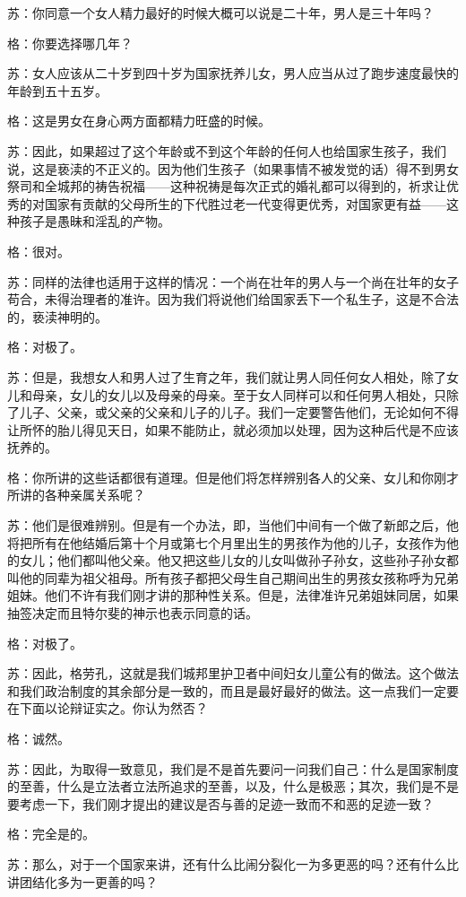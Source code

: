 \documentclass[12pt,oneside]{book}
\begin{document}
苏：你同意一个女人精力最好的时候大概可以说是二十年，男人是三十年吗？

格：你要选择哪几年？

苏：女人应该从二十岁到四十岁为国家抚养儿女，男人应当从过了跑步速度最快的年龄到五十五岁。

格：这是男女在身心两方面都精力旺盛的时候。

苏：因此，如果超过了这个年龄或不到这个年龄的任何人也给国家生孩子，我们说，这是亵渎的不正义的。因为他们生孩子（如果事情不被发觉的话）得不到男女祭司和全城邦的祷告祝福——这种祝祷是每次正式的婚礼都可以得到的，祈求让优秀的对国家有贡献的父母所生的下代胜过老一代变得更优秀，对国家更有益——这种孩子是愚昧和淫乱的产物。

格：很对。

苏：同样的法律也适用于这样的情况：一个尚在壮年的男人与一个尚在壮年的女子苟合，未得治理者的准许。因为我们将说他们给国家丢下一个私生子，这是不合法的，亵渎神明的。

格：对极了。

苏：但是，我想女人和男人过了生育之年，我们就让男人同任何女人相处，除了女儿和母亲，女儿的女儿以及母亲的母亲。至于女人同样可以和任何男人相处，只除了儿子、父亲，或父亲的父亲和儿子的儿子。我们一定要警告他们，无论如何不得让所怀的胎儿得见天日，如果不能防止，就必须加以处理，因为这种后代是不应该抚养的。

格：你所讲的这些话都很有道理。但是他们将怎样辨别各人的父亲、女儿和你刚才所讲的各种亲属关系呢？

苏：他们是很难辨别。但是有一个办法，即，当他们中间有一个做了新郎之后，他将把所有在他结婚后第十个月或第七个月里出生的男孩作为他的儿子，女孩作为他的女儿；他们都叫他父亲。他又把这些儿女的儿女叫做孙子孙女，这些孙子孙女都叫他的同辈为祖父祖母。所有孩子都把父母生自己期间出生的男孩女孩称呼为兄弟姐妹。他们不许有我们刚才讲的那种性关系。但是，法律准许兄弟姐妹同居，如果抽签决定而且特尔斐的神示也表示同意的话。

格：对极了。

苏：因此，格劳孔，这就是我们城邦里护卫者中间妇女儿童公有的做法。这个做法和我们政治制度的其余部分是一致的，而且是最好最好的做法。这一点我们一定要在下面以论辩证实之。你认为然否？

格：诚然。

苏：因此，为取得一致意见，我们是不是首先要问一问我们自己：什么是国家制度的至善，什么是立法者立法所追求的至善，以及，什么是极恶；其次，我们是不是要考虑一下，我们刚才提出的建议是否与善的足迹一致而不和恶的足迹一致？

格：完全是的。

苏：那么，对于一个国家来讲，还有什么比闹分裂化一为多更恶的吗？还有什么比讲团结化多为一更善的吗？
\end{document}
